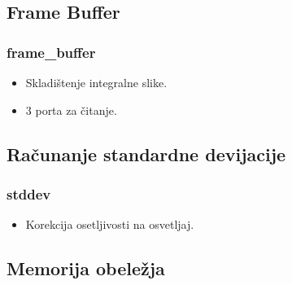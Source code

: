 \documentclass{beamer}
\begin{document}
\subsection{Frame Buffer}

\begin{frame}
  \frametitle<1-1>{frame\_buffer}

  \begin{itemize}
  \item<1-1> Skladištenje integralne slike.
  \item<1-1> 3 porta za čitanje.

  \end{itemize}

  \begin{figure}[H]
  \end{figure}
\end{frame}

\subsection{Računanje standardne devijacije}

\begin{frame}
  \frametitle<1-1>{stddev}

  \begin{itemize}
  \item<1-1> Korekcija osetljivosti na osvetljaj.

  \end{itemize}

  \begin{figure}[H]
  \end{figure}
\end{frame}

\subsection{Memorija obeležja}
\end{document}
